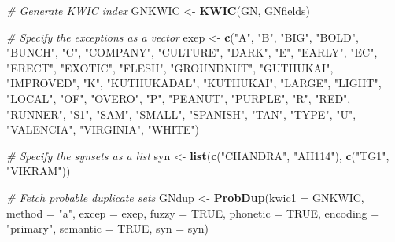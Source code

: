 \documentclass[]{article}
\newenvironment{Shaded}{\begin{snugshade}}{\end{snugshade}}
\newcommand{\CommentTok}[1]{\textcolor[rgb]{0.56,0.35,0.01}{\textit{#1}}}
\newcommand{\DataTypeTok}[1]{\textcolor[rgb]{0.13,0.29,0.53}{#1}}
\newcommand{\KeywordTok}[1]{\textcolor[rgb]{0.13,0.29,0.53}{\textbf{#1}}}
\newcommand{\NormalTok}[1]{#1}
\newcommand{\OtherTok}[1]{\textcolor[rgb]{0.56,0.35,0.01}{#1}}
\newcommand{\StringTok}[1]{\textcolor[rgb]{0.31,0.60,0.02}{#1}}
\begin{document}
\begin{Shaded}
\begin{Highlighting}[]
\CommentTok{# Generate KWIC index}
\NormalTok{GNKWIC <-}\StringTok{ }\KeywordTok{KWIC}\NormalTok{(GN, GNfields)}

\CommentTok{# Specify the exceptions as a vector}
\NormalTok{exep <-}\StringTok{ }\KeywordTok{c}\NormalTok{(}\StringTok{"A"}\NormalTok{, }\StringTok{"B"}\NormalTok{, }\StringTok{"BIG"}\NormalTok{, }\StringTok{"BOLD"}\NormalTok{, }\StringTok{"BUNCH"}\NormalTok{, }\StringTok{"C"}\NormalTok{, }\StringTok{"COMPANY"}\NormalTok{, }\StringTok{"CULTURE"}\NormalTok{,}
         \StringTok{"DARK"}\NormalTok{, }\StringTok{"E"}\NormalTok{, }\StringTok{"EARLY"}\NormalTok{, }\StringTok{"EC"}\NormalTok{, }\StringTok{"ERECT"}\NormalTok{, }\StringTok{"EXOTIC"}\NormalTok{, }\StringTok{"FLESH"}\NormalTok{, }\StringTok{"GROUNDNUT"}\NormalTok{,}
         \StringTok{"GUTHUKAI"}\NormalTok{, }\StringTok{"IMPROVED"}\NormalTok{, }\StringTok{"K"}\NormalTok{, }\StringTok{"KUTHUKADAL"}\NormalTok{, }\StringTok{"KUTHUKAI"}\NormalTok{, }\StringTok{"LARGE"}\NormalTok{,}
         \StringTok{"LIGHT"}\NormalTok{, }\StringTok{"LOCAL"}\NormalTok{, }\StringTok{"OF"}\NormalTok{, }\StringTok{"OVERO"}\NormalTok{, }\StringTok{"P"}\NormalTok{, }\StringTok{"PEANUT"}\NormalTok{, }\StringTok{"PURPLE"}\NormalTok{, }\StringTok{"R"}\NormalTok{,}
         \StringTok{"RED"}\NormalTok{, }\StringTok{"RUNNER"}\NormalTok{, }\StringTok{"S1"}\NormalTok{, }\StringTok{"SAM"}\NormalTok{, }\StringTok{"SMALL"}\NormalTok{, }\StringTok{"SPANISH"}\NormalTok{, }\StringTok{"TAN"}\NormalTok{, }\StringTok{"TYPE"}\NormalTok{,}
         \StringTok{"U"}\NormalTok{, }\StringTok{"VALENCIA"}\NormalTok{, }\StringTok{"VIRGINIA"}\NormalTok{, }\StringTok{"WHITE"}\NormalTok{)}

\CommentTok{# Specify the synsets as a list}
\NormalTok{syn <-}\StringTok{ }\KeywordTok{list}\NormalTok{(}\KeywordTok{c}\NormalTok{(}\StringTok{"CHANDRA"}\NormalTok{, }\StringTok{"AH114"}\NormalTok{), }\KeywordTok{c}\NormalTok{(}\StringTok{"TG1"}\NormalTok{, }\StringTok{"VIKRAM"}\NormalTok{))}

\CommentTok{# Fetch probable duplicate sets}
\NormalTok{GNdup <-}\StringTok{ }\KeywordTok{ProbDup}\NormalTok{(}\DataTypeTok{kwic1 =}\NormalTok{ GNKWIC, }\DataTypeTok{method =} \StringTok{"a"}\NormalTok{, }\DataTypeTok{excep =}\NormalTok{ exep, }\DataTypeTok{fuzzy =} \OtherTok{TRUE}\NormalTok{,}
                 \DataTypeTok{phonetic =} \OtherTok{TRUE}\NormalTok{, }\DataTypeTok{encoding =} \StringTok{"primary"}\NormalTok{,}
                 \DataTypeTok{semantic =} \OtherTok{TRUE}\NormalTok{, }\DataTypeTok{syn =}\NormalTok{ syn)}
\end{Highlighting}
\end{Shaded}
\end{document}

